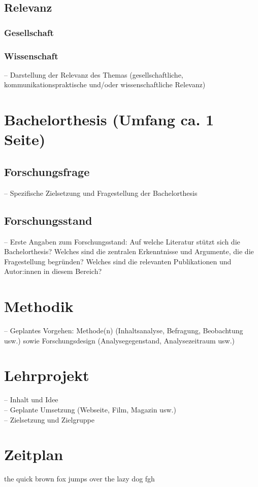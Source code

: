 \documentclass[12pt,a4paper]{article}        %
\begin{document}
\subsection{Relevanz}
\subsubsection{Gesellschaft}
\subsubsection{Wissenschaft}
– Darstellung der Relevanz des Themas (gesellschaftliche, kommunikationspraktische und/oder wissenschaftliche Relevanz)
\section{Bachelorthesis (Umfang ca. 1 Seite)}
\subsection{Forschungsfrage}
– Spezifische Zielsetzung und Fragestellung der Bachelorthesis
\subsection{Forschungsstand}
– Erste Angaben zum Forschungsstand: Auf welche Literatur stützt sich die Bachelorthesis? Welches sind die zentralen Erkenntnisse und Argumente, die die Fragestellung begründen? Welches sind die relevanten Publikationen und Autor:innen in diesem Bereich?
\section{Methodik}
– Geplantes Vorgehen: Methode(n) (Inhaltsanalyse, Befragung, Beobachtung usw.) sowie Forschungsdesign (Analysegegenstand, Analysezeitraum usw.)
\section{Lehrprojekt}
– Inhalt und Idee
\\– Geplante Umsetzung (Webseite, Film, Magazin usw.)
\\– Zielsetzung und Zielgruppe
\pagebreak
\section{Zeitplan}

the quick brown fox jumps over the lazy dog
fgh\smartcite[1-500, 28]{eg34} %
\end{document}
